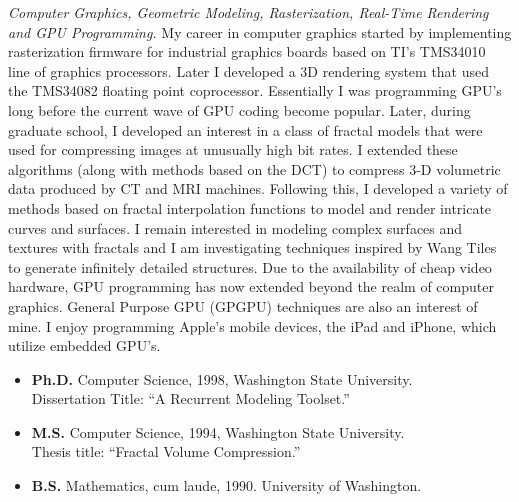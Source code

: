 \documentclass[10pt]{article}
\begin{document}
{\em Computer Graphics, Geometric Modeling, Rasterization, Real-Time Rendering
and GPU Programming.}
My career in computer graphics started by 
implementing rasterization firmware
for industrial graphics boards based on
TI's TMS34010 line of graphics processors.
Later I developed a 3D rendering system
that used the TMS34082 floating  point coprocessor.
Essentially I was programming GPU's long before
the current wave of GPU coding become popular.
Later, during graduate school, I developed an interest
in a class of fractal models that were used for compressing
images at unusually high bit rates. I extended these
algorithms (along with methods based on the DCT)
to compress 3-D volumetric data produced by CT
and MRI machines. Following this, I developed a variety of methods
based on fractal interpolation functions to model
and render intricate curves and surfaces.
I remain interested in modeling 
complex surfaces and textures with fractals and I am
investigating techniques inspired by
Wang Tiles to generate infinitely detailed structures.
Due to the availability of cheap video hardware,
GPU programming
has now extended beyond the realm of computer graphics.
General Purpose GPU (GPGPU) techniques are also
an interest of mine.
I enjoy programming Apple's mobile devices, the iPad and iPhone,
which utilize embedded GPU's.

\vspace{0.5cm}


\begin{itemize}
\item {\bf Ph.D.} Computer Science, 1998,
Washington State University. \\
Dissertation Title: ``A Recurrent Modeling Toolset.''

\item {\bf M.S.} Computer Science, 1994,
Washington State University. \\
Thesis title: ``Fractal Volume Compression.''

\item {\bf B.S.} Mathematics, cum laude, 1990.
University of Washington. 
\end{itemize}
\end{document}

